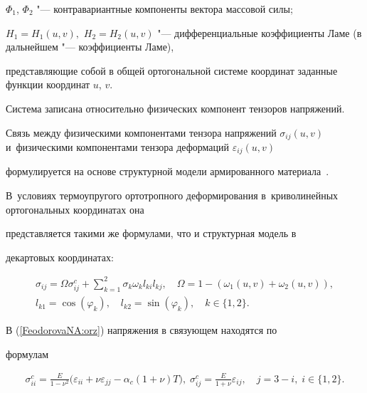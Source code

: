 $\Phi_1$, $\Phi_2$ "--- контравариантные компоненты вектора массовой силы;

$H_1=H_1(u,v),$ $H_2=H_2(u,v)$ "--- дифференциальные коэффициенты Ламе (в дальнейшем "--- коэффициенты Ламе), 

представляющие собой в общей ортогональной системе координат заданные функции координат $u$, $v$. 

Система записана относительно физических компонент тензоров напряжений.

Связь между физическими компонентами тензора напряжений $\sigma_{ij}(u,v)$ и~физическими компонентами тензора деформаций $\varepsilon_{ij}(u,v)$

формулируется на основе структурной модели армированного материала~\cite{FeodorovaNA:N}. 

В~условиях термоупругого ортотропного деформирования  в~криволинейных ортогональных координатах она

представляется такими же формулами, что и структурная модель в

декартовых координатах:

\begin{equation}

\label{FeodorovaNA:orz} 

\begin{array}{c} \displaystyle

\sigma_{ij}=\Omega \sigma_{ij}^{c}+\sum_{k=1}^{2}\sigma_{k}\omega_{k}l_{ki}l_{kj},\quad \Omega=1-(\omega_1(u,v)+\omega_2(u,v)),\\

l_{k1}=\cos(\varphi_k),\quad l_{k2}=\sin(\varphi_k),\quad k\in \{1, 2\}.

\end{array}

\end{equation}

В (\ref{FeodorovaNA:orz}) напряжения в связующем находятся по

формулам

\begin{equation}

\label{FeodorovaNA:orz1}

\begin{array}{c}  

\sigma_{ii}^{c}=\frac{E}{1-\nu^2}\bigl(\varepsilon_{ii}+\nu\varepsilon_{jj}- \alpha_c(1+\nu)T\bigr),\;

\sigma_{ij}^{c}=\frac{E}{1+\nu}\varepsilon_{ij}, \quad 

j=3-i,\; i\in \{1, 2\}.

\end{array}

\end{equation}

